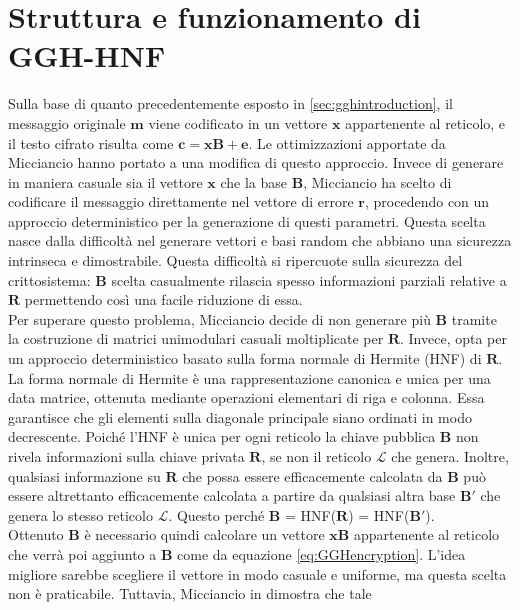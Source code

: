 \section{Struttura e funzionamento di GGH-HNF}
Sulla base di quanto precedentemente esposto in \ref{sec:gghintroduction}, 
il messaggio originale $\mathbf{m}$ viene codificato in un vettore $\mathbf{x}$ 
appartenente al reticolo, e il testo cifrato risulta come 
$\mathbf{c} = \mathbf{x}\mathbf{B} + \mathbf{e}$.
Le ottimizzazioni apportate da Micciancio hanno portato a una modifica di questo approccio. 
Invece di generare in maniera casuale sia il vettore $\mathbf{x}$ che la base $\mathbf{B}$, 
Micciancio ha scelto di codificare il messaggio direttamente nel vettore di errore $\mathbf{r}$, 
procedendo con un approccio deterministico per la generazione di questi parametri.
Questa scelta nasce dalla difficoltà nel generare vettori e basi random che abbiano una 
sicurezza intrinseca e dimostrabile. Questa difficoltà si ripercuote sulla sicurezza del 
crittosistema: $\mathbf{B}$ scelta casualmente rilascia spesso informazioni parziali
relative a $\mathbf{R}$ permettendo così una facile riduzione di essa. \\
Per superare questo problema, Micciancio decide di non generare più $\mathbf{B}$ tramite 
la costruzione di matrici unimodulari casuali moltiplicate per $\mathbf{R}$. 
Invece, opta per un approccio deterministico basato sulla forma normale di Hermite (HNF)
di $\mathbf{R}$. La forma normale di Hermite è una rappresentazione canonica e unica per 
una data matrice, ottenuta mediante operazioni elementari di riga e colonna. 
Essa garantisce che gli elementi sulla diagonale principale siano ordinati in modo decrescente.
Poiché l'HNF è unica per ogni reticolo la chiave pubblica $\mathbf{B}$ non rivela informazioni 
sulla chiave privata $\mathbf{R}$, se non il reticolo $\mathcal{L}$ che genera.
Inoltre, qualsiasi informazione su $\mathbf{R}$ che possa essere efficacemente calcolata 
da $\mathbf{B}$ può 
essere altrettanto efficacemente calcolata a partire da qualsiasi altra base $\mathbf{B}'$ 
che genera lo stesso reticolo $\mathcal{L}$. Questo perché 
$\mathbf{B}$ = HNF($\mathbf{R}$) = HNF($\mathbf{B}'$). \\
Ottenuto $\mathbf{B}$ è necessario quindi calcolare un vettore
$\mathbf{x}\mathbf{B}$ appartenente al reticolo che verrà poi aggiunto a $\mathbf{B}$ come
da equazione \ref{eq:GGHencryption}.  
L'idea migliore sarebbe scegliere il vettore in modo casuale e uniforme, ma questa scelta 
non è praticabile. Tuttavia, Micciancio in \cite[Sezione 4.1]{HNF01} dimostra che tale 
